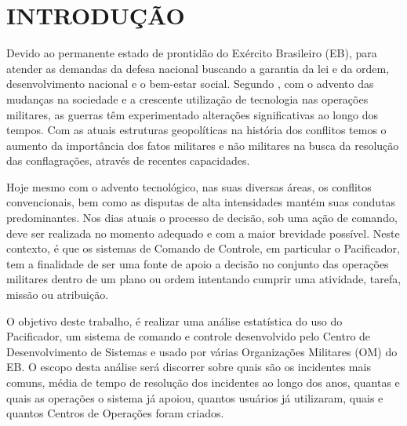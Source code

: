 % 
%


\chapter{INTRODUÇÃO}
\label{chap:introducao}
Devido ao permanente estado de prontidão do Exército Brasileiro (EB), para atender as demandas da defesa nacional buscando a garantia da lei e da ordem, desenvolvimento nacional e o bem-estar social. Segundo , com o advento das mudanças na sociedade e a crescente utilização de  tecnologia nas operações militares, as guerras têm experimentado alterações significativas ao longo dos tempos. Com as atuais estruturas geopolíticas na história dos conflitos temos o aumento da importância dos fatos militares e não militares na busca da resolução das conflagrações, através de recentes capacidades.

Hoje mesmo com o advento tecnológico, nas suas diversas áreas, os conflitos convencionais, bem como as disputas de alta intensidades mantém suas condutas predominantes. Nos dias atuais o processo de decisão, sob uma ação de comando, deve ser realizada no momento adequado e com a maior brevidade possível. Neste contexto, é que os sistemas de Comando de Controle, em particular o Pacificador, tem a finalidade de ser uma fonte de apoio a decisão no conjunto das operações militares dentro de um plano ou ordem intentando cumprir uma atividade, tarefa, missão ou atribuição. 

O objetivo deste trabalho, é realizar uma análise estatística do uso do Pacificador, um sistema de comando e controle desenvolvido pelo Centro de Desenvolvimento de Sistemas e usado por várias Organizações Militares (OM) do EB. O escopo desta análise será discorrer sobre quais são os incidentes mais comuns, média de tempo de resolução dos incidentes ao longo dos anos, quantas e quais as operações o sistema já apoiou, quantos usuários já utilizaram, quais e quantos Centros de Operações foram criados.


